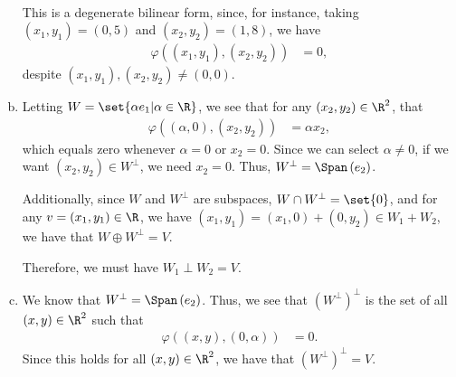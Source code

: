 \documentclass[10pt]{mypackage}
\begin{document}
\begin{solution}
\begin{enumerate}[(a)]
\begin{align*}
      \end{align*}
      This is a degenerate bilinear form, since, for instance, taking $\left(x_1,y_1\right) = \left(0,5\right)$ and $\left(x_2,y_2\right) = (1,8)$, we have
      \begin{align*}
        \varphi\left(\left(x_1,y_1\right),\left(x_2,y_2\right)\right) &= 0,
      \end{align*}
      despite $\left(x_1,y_1\right),\left(x_2,y_2\right)\neq \left(0,0\right)$.
    \item Letting $W = \set{\alpha e_1 | \alpha \in \R}$, we see that for any $\left(x_2,y_2\right)\in \R^2$, that
      \begin{align*}
        \varphi\left(\left(\alpha,0\right),\left(x_2,y_2\right)\right) &= \alpha x_2,
      \end{align*}
      which equals zero whenever $\alpha = 0$ or $x_2 = 0$. Since we can select $\alpha \neq 0$, if we want $\left(x_2,y_2\right)\in W^{\perp}$, we need $x_2 = 0$. Thus, $W^{\perp} = \Span\left(e_2\right)$.\newline

      Additionally, since $W$ and $W^{\perp}$ are subspaces, $W\cap W^{\perp} = \set{0}$, and for any $v = \left(x_1,y_1\right)\in \R$, we have $\left(x_1,y_1\right) = \left(x_1,0\right) + \left(0,y_2\right)\in W_1 + W_2$, we have that $W \oplus W^{\perp} = V$.\newline

      Therefore, we must have $W_1 \perp W_2 = V$.
    \item We know that $W^{\perp} = \Span\left(e_2\right)$. Thus, we see that $\left(W^{\perp}\right)^{\perp}$ is the set of all $\left(x,y\right)\in \R^2$ such that
      \begin{align*}
        \varphi\left(\left(x,y\right),\left(0,\alpha\right)\right) &= 0.
      \end{align*}
      Since this holds for all $\left(x,y\right)\in \R^2$, we have that $\left(W^{\perp}\right)^{\perp} = V$.
  \end{enumerate}
\end{solution}
\end{document}
